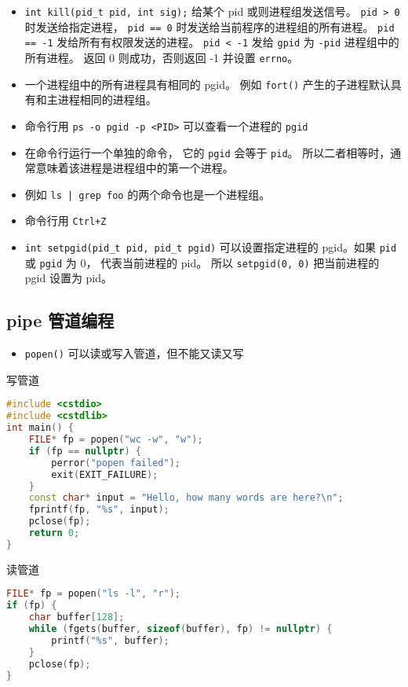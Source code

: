 \begin{itemize}
\item \verb`int kill(pid_t pid, int sig);` 给某个 pid 或则进程组发送信号。 \verb`pid > 0` 时发送给指定进程， \verb`pid == 0` 时发送给当前程序的进程组的所有进程。 \verb`pid == -1` 发给所有有权限发送的进程。 \verb`pid < -1` 发给 \verb`gpid` 为 \verb`-pid` 进程组中的所有进程。 返回 0 则成功，否则返回 -1 并设置 \verb`errno`。
\item 一个进程组中的所有进程具有相同的 pgid。 例如 \verb`fort()` 产生的子进程默认具有和主进程相同的进程组。
\item 命令行用 \verb`ps -o pgid -p <PID>` 可以查看一个进程的 \verb`pgid`
\item 在命令行运行一个单独的命令， 它的 \verb`pgid` 会等于 \verb`pid`。 所以二者相等时，通常意味着该进程是进程组中的第一个进程。
\item 例如 \verb`ls | grep foo` 的两个命令也是一个进程组。
\item 命令行用 \verb`Ctrl+Z`
\item \verb`int setpgid(pid_t pid, pid_t pgid)` 可以设置指定进程的 pgid。如果 \verb`pid` 或 \verb`pgid` 为 0， 代表当前进程的 pid。 所以 \verb`setpgid(0, 0)` 把当前进程的 pgid 设置为 pid。
\end{itemize}

\subsection{pipe 管道编程}
\begin{itemize}
\item \verb`popen()` 可以读或写入管道，但不能又读又写
\end{itemize}

写管道
\begin{lstlisting}[language=cpp]
#include <cstdio>
#include <cstdlib>
int main() {
    FILE* fp = popen("wc -w", "w");
    if (fp == nullptr) {
        perror("popen failed");
        exit(EXIT_FAILURE);
    }
    const char* input = "Hello, how many words are here?\n";
    fprintf(fp, "%s", input);
    pclose(fp);
    return 0;
}
\end{lstlisting}
读管道
\begin{lstlisting}[language=cpp]
FILE* fp = popen("ls -l", "r");
if (fp) {
    char buffer[128];
    while (fgets(buffer, sizeof(buffer), fp) != nullptr) {
        printf("%s", buffer);
    }
    pclose(fp);
}
\end{lstlisting}

